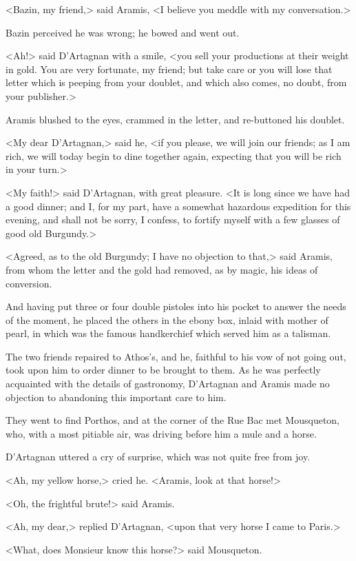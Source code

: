 <Bazin, my friend,> said Aramis, <I believe you meddle with my conversation.> 

Bazin perceived he was wrong; he bowed and went out. 

<Ah!> said D'Artagnan with a smile, <you sell your productions at their weight in gold. You are very fortunate, my friend; but take care or you will lose that letter which is peeping from your doublet, and which also comes, no doubt, from your publisher.> 

Aramis blushed to the eyes, crammed in the letter, and re-buttoned his doublet. 

<My dear D'Artagnan,> said he, <if you please, we will join our friends; as I am rich, we will today begin to dine together again, expecting that you will be rich in your turn.> 

<My faith!> said D'Artagnan, with great pleasure. <It is long since we have had a good dinner; and I, for my part, have a somewhat hazardous expedition for this evening, and shall not be sorry, I confess, to fortify myself with a few glasses of good old Burgundy.> 

<Agreed, as to the old Burgundy; I have no objection to that,> said Aramis, from whom the letter and the gold had removed, as by magic, his ideas of conversion. 

And having put three or four double pistoles into his pocket to answer the needs of the moment, he placed the others in the ebony box, inlaid with mother of pearl, in which was the famous handkerchief which served him as a talisman. 

The two friends repaired to Athos's, and he, faithful to his vow of not going out, took upon him to order dinner to be brought to them. As he was perfectly acquainted with the details of gastronomy, D'Artagnan and Aramis made no objection to abandoning this important care to him. 

They went to find Porthos, and at the corner of the Rue Bac met Mousqueton, who, with a most pitiable air, was driving before him a mule and a horse. 

D'Artagnan uttered a cry of surprise, which was not quite free from joy. 

<Ah, my yellow horse,> cried he. <Aramis, look at that horse!> 

<Oh, the frightful brute!> said Aramis. 

<Ah, my dear,> replied D'Artagnan, <upon that very horse I came to Paris.> 

<What, does Monsieur know this horse?> said Mousqueton. 


